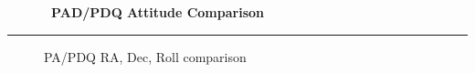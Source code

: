 % 
% 
% 
% 
% 
%
\cleardoublepage
\begin{figure*}[h!]
  \centering
  \hfill
  {\Huge {\bf \quarter\ PAD/PDQ Attitude Comparison}}
  \hfill
\end{figure*}
\hrule
\begin{figure*}[h!]
  \centering
  \hfill
  \caption{PA/PDQ RA, Dec, Roll comparison}
\end{figure*}

